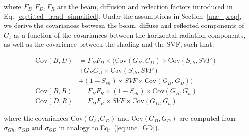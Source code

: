 where $F_{B}, F_{D}, F_{R}$ are the beam, diffusion and reflection factors introduced in Eq.~\ref{eq:tilted_irrad_simplified}. 
Under the assumptions in Section~\ref{unc_prop}, we derive the covariances between the beam, diffuse and reflected components of $G_t$ as a function of the covariances between the horizontal radiation components, as well as the covariance between the shading and the SVF, such that:

\begin{equation}
\begin{aligned}
\mathrm{Cov}(B, D) & = F_{B}  F_{D} \times (\mathrm{Cov}(G_B, G_D) \times \mathrm{Cov}(S_{sh}, SVF) \\
& + G_B  G_D \times \mathrm{Cov}(S_{sh}, SVF) \\
& + (1-S_{sh}) \times SVF \times \mathrm{Cov}(G_B, G_D)) \\
\mathrm{Cov}(B, R) & = F_{B}  F_{R} \times (1-S_{sh}) \times \mathrm{Cov}(G_B, G_h) \\
\mathrm{Cov}(D, R) & = F_{D}  F_{R} \times SVF  \times      \mathrm{Cov}(G_D, G_h) 
\end{aligned}
\end{equation}

where the covariances $\mathrm{Cov}(G_h, G_D)$ and $\mathrm{Cov}(G_B, G_D)$ are computed from $\sigma_{Gh}, \sigma_{GB}$ and $\sigma_{GD}$ in analogy to Eq.~(\ref{eq:unc_GD}).